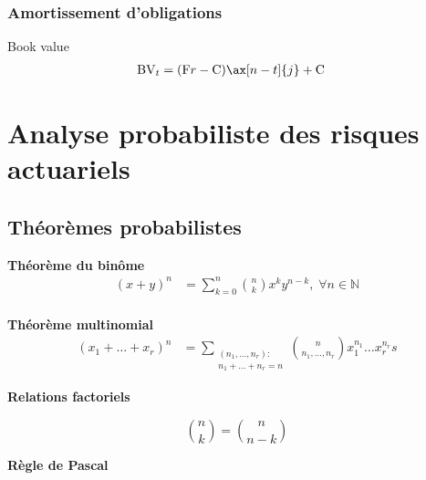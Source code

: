 \documentclass[10pt, french]{article}
\begin{document}
\begin{multicols*}{2}
\subsubsection*{Amortissement d'obligations}

Book value
\begin{align*}
	\text{BV}_{t}
		&=	(\text{F}r - \text{C}) \ax[n - t]{j} + \text{C}
\end{align*}

\newpage

\section*{Analyse probabiliste des risques actuariels}

\subsection*{Théorèmes probabilistes}

\textbf{Théorème du binôme}
\begin{align*}
	(x + y)^{n}
		&=	\sum_{k = 0}^{n} \binom{n}{k} x^{k} y^{n - k}, \; \forall n \in \mathds{N}	\\
\end{align*}

%

\textbf{Théorème multinomial}
\begin{align*}
	(x_1 + \dots + x_r)^{n}
		&=	\sum_{\substack{(n_1, \dots, n_r): \\ n_1 + \dots + n_r = n}} \binom{n}{n_{1}, \dots, n_{r}} x_{1}^{n_{1}} \dots x_{r}^{n_{r}}	s
\end{align*}

\begin{minipage}[ht]{0.5\linewidth}
\textbf{Relations factoriels}

\begin{equation*}
	\binom{n}{k}
		=	\binom{n}{n - k}		
\end{equation*}
\end{minipage}
\begin{minipage}[ht]{0.5\linewidth}
\textbf{Règle de Pascal}


\end{minipage}
\end{multicols*}
\end{document}
